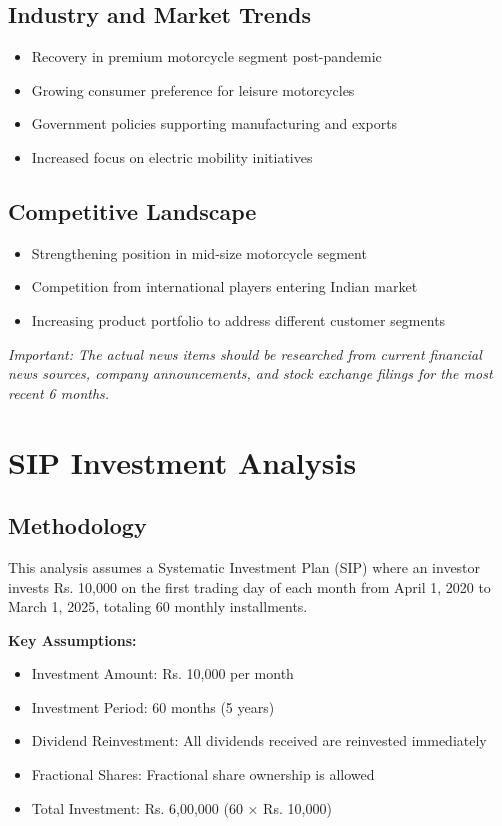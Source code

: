 \documentclass[8pt,a4paper]{article}
\begin{document}
\subsection{Industry and Market Trends}
\begin{itemize}
    \item Recovery in premium motorcycle segment post-pandemic
    \item Growing consumer preference for leisure motorcycles
    \item Government policies supporting manufacturing and exports
    \item Increased focus on electric mobility initiatives
\end{itemize}

\subsection{Competitive Landscape}
\begin{itemize}
    \item Strengthening position in mid-size motorcycle segment
    \item Competition from international players entering Indian market
    \item Increasing product portfolio to address different customer segments
\end{itemize}

\textit{Important: The actual news items should be researched from current financial news sources, company announcements, and stock exchange filings for the most recent 6 months.}

\section{SIP Investment Analysis}

\subsection{Methodology}

This analysis assumes a Systematic Investment Plan (SIP) where an investor invests Rs. 10,000 on the first trading day of each month from April 1, 2020 to March 1, 2025, totaling 60 monthly installments.

\textbf{Key Assumptions:}
\begin{itemize}
    \item Investment Amount: Rs. 10,000 per month
    \item Investment Period: 60 months (5 years)
    \item Dividend Reinvestment: All dividends received are reinvested immediately
    \item Fractional Shares: Fractional share ownership is allowed
    \item Total Investment: Rs. 6,00,000 (60 × Rs. 10,000)
\end{itemize}
\end{document}
